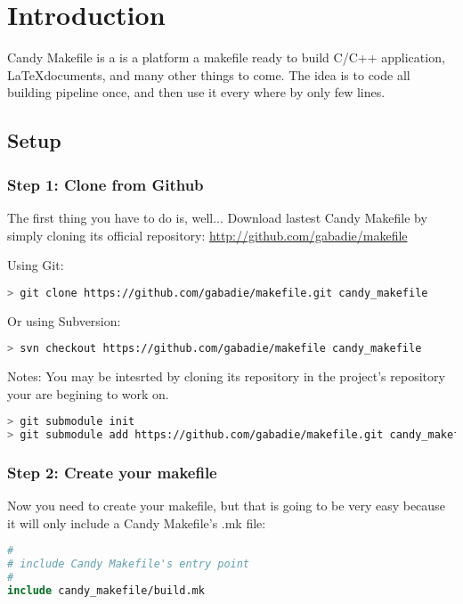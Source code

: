 \chapter{Introduction}

Candy Makefile is a is a platform a makefile ready to build C/C++ application, \LaTeX documents,
and many other things to come. The idea is to code all building pipeline once, and then use it
every where by only few lines.


\section{Setup}

\subsection{Step 1: Clone from Github}

The first thing you have to do is, well... Download lastest Candy Makefile by simply cloning
its official repository: \url{http://github.com/gabadie/makefile}

Using Git:
\begin{lstlisting}[language=bash]
> git clone https://github.com/gabadie/makefile.git candy_makefile
\end{lstlisting}

Or using Subversion:
\begin{lstlisting}[language=bash]
> svn checkout https://github.com/gabadie/makefile candy_makefile
\end{lstlisting}

Notes: You may be intesrted by cloning its repository in the project's repository your are begining
to work on.
\begin{lstlisting}[language=bash]
> git submodule init
> git submodule add https://github.com/gabadie/makefile.git candy_makefile
\end{lstlisting}


\subsection{Step 2: Create your makefile}

Now you need to create your makefile, but that is going to be very easy because it will only
include a Candy Makefile's .mk file:

\begin{lstlisting}[language=make]
#
# include Candy Makefile's entry point
#
include candy_makefile/build.mk
\end{lstlisting}


